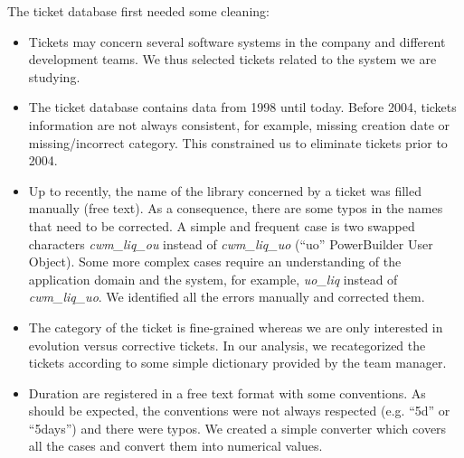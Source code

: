 \documentclass[10pt,conference]{IEEEtran}
\begin{document}
The ticket database first needed some cleaning:
\begin{itemize}
  \item Tickets may concern several software systems in the company and different development teams.
  We thus selected tickets related to the system we are studying.
  
  \item The ticket database contains data from 1998  until today. 
  Before 2004, tickets information are not always consistent, for example, missing creation date or missing/incorrect category.
  This constrained us to eliminate tickets prior to 2004.

  \item Up to recently, the name of the library concerned by a ticket was filled manually (free text).
  As a consequence, there are some typos in the names that need to be corrected.
  A simple and frequent case is two swapped characters \emph{cwm\_liq\_ou} instead of \emph{cwm\_liq\_uo} (``uo'' PowerBuilder User Object).
  Some more complex cases require an understanding of the application domain and the system, for example, \emph{uo\_liq} instead of \emph{cwm\_liq\_uo}.
  We identified all the errors manually and corrected them.
  
  \item The category of the ticket is fine-grained whereas we are only interested in evolution versus corrective tickets.
  In our analysis, we recategorized the tickets according to some simple dictionary provided by the team manager.

  \item Duration are registered in a free text format with some conventions.
  As should be expected, the conventions were not always respected (e.g. ``5d'' or ``5days'') and there were typos.
  We created a simple  converter which covers all the cases and convert them into numerical values.
  
\end{itemize}
 
\end{document}
